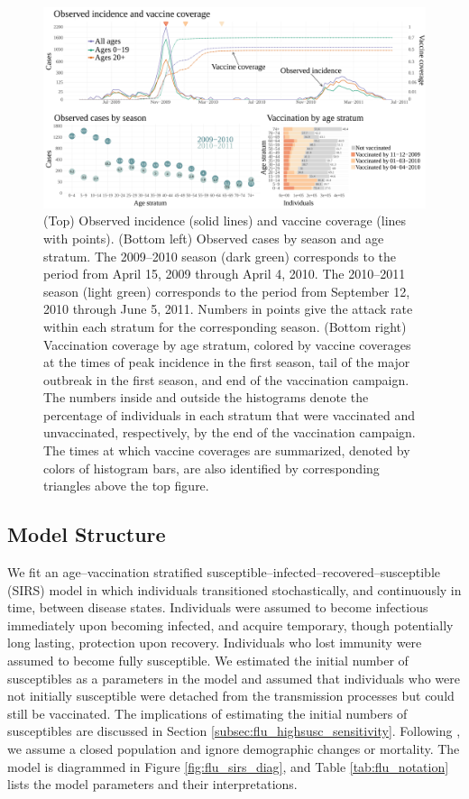 \begin{figure}
	\centering
	\includegraphics[width=\linewidth]{figures/fludat_plots}
	\caption[A(H1N1)pdm09 incidence and vaccination data from Finland, April 15, 2009 --- June 5, 2011.]{(Top) Observed incidence (solid lines) and vaccine coverage (lines with points). (Bottom left) Observed cases by season and age stratum. The 2009--2010 season (dark green) corresponds to the period from April 15, 2009 through April 4, 2010. The 2010--2011 season (light green) corresponds to the period from September 12, 2010 through June 5, 2011. Numbers in points give the attack rate within each stratum for the corresponding season. (Bottom right) Vaccination coverage by age stratum, colored by vaccine coverages at the times of peak incidence in the first season, tail of the major outbreak in the first season, and end of the vaccination campaign. The numbers inside and outside the histograms denote the percentage of individuals in each stratum that were vaccinated and unvaccinated, respectively, by the end of the vaccination campaign. The times at which vaccine coverages are summarized, denoted by colors of histogram bars, are also identified by corresponding triangles above the top figure.}
	\label{fig:finland_fludat}
\end{figure}

\subsection{Model Structure}
\label{subsec:flu_modstructure}

We fit an age--vaccination stratified susceptible--infected--recovered--susceptible (SIRS) model in which individuals transitioned stochastically, and continuously in time, between disease states. Individuals were assumed to become infectious immediately upon becoming infected, and acquire temporary, though potentially long lasting, protection upon recovery. Individuals who lost immunity were assumed to become fully susceptible. We estimated the initial number of susceptibles as a parameters in the model and assumed that individuals who were not initially susceptible were detached from the transmission processes but could still be vaccinated. The implications of estimating the initial numbers of susceptibles are discussed in Section \ref{subsec:flu_highsusc_sensitivity}. Following \cite{shubin2016revealing}, we assume a closed population and ignore demographic changes or mortality. The model is diagrammed in Figure \ref{fig:flu_sirs_diag}, and Table \ref{tab:flu_notation} lists the model parameters and their interpretations. 


